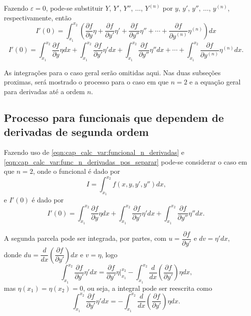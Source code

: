 \documentclass[
	12pt,				%
	openright,			%
    twoside,			%
	a4paper,			%
	english,			%
	french,				%
	spanish,			%
	brazil				%
	]{abntex2}
\numberwithin{lema}{chapter}
\numberwithin{teorema}{chapter}
\numberwithin{definicao}{chapter}
\numberwithin{exemplo}{chapter}
\numberwithin{figure}{chapter}
\begin{document}
Fazendo $\varepsilon=0$, pode-se substituir $Y$, $Y'$, $Y''$, $\dots$, $Y^{(n)}$ por $y$, $y'$, $y''$, $\dots$, $y^{(n)}$, respectivamente, então
$$
	I'(0)= \int_{x_1}^{x_2} \left (
		\frac{\partial f}{\partial y} \eta
		+
		\frac{\partial f}{\partial y'} \eta'
		+
		\frac{\partial f}{\partial y''} \eta''
		+
		\cdots
		+
		\frac{\partial f}{\partial y^{(n)}} \eta^{(n)}
	\right )dx
$$
\begin{equation}
	\label{eqn:cap_calc_var:func_n_derivadas_pos_separar}
	I'(0)= 
	\int_{x_1}^{x_2}
		\frac{\partial f}{\partial y} \eta
	dx
	+		
	\int_{x_1}^{x_2}
		\frac{\partial f}{\partial y'} \eta'
	dx
	+
	\int_{x_1}^{x_2}
		\frac{\partial f}{\partial y''} \eta''
	dx
	+
	\cdots
	+
	\int_{x_1}^{x_2}
		\frac{\partial f}{\partial y^{(n)}} \eta^{(n)}
	dx
	\text{.}
\end{equation}

As integrações para o caso geral serão omitidas aqui. Nas duas subseções proximas, será mostrado o processo para o caso em que $n=2$ e a equação geral para derivadas até a ordem $n$.

\subsection{Processo para funcionais que dependem de derivadas de segunda ordem}

Fazendo uso de \eqref{eqn:cap_calc_var:funcional_n_derivadas} e \eqref{eqn:cap_calc_var:func_n_derivadas_pos_separar} pode-se considerar o caso em que $n=2$, onde o funcional é dado por
$$
	I=\int_{x_1}^{x_2} f(x, y, y', y'')dx
	\text{,}
$$
e $I'(0)$ é dado por
\begin{equation}
	\label{eqn:cap_calc_var:func_2_derivada_integracao}
	I'(0)=
	\int_{x_1}^{x_2}
		\frac{\partial f}{\partial y}
		\eta
	dx
	+
	\int_{x_1}^{x_2}
		\frac{\partial f}{\partial y'}
		\eta'
	dx
	+
	\int_{x_1}^{x_2}
		\frac{\partial f}{\partial y''}
		\eta''
	dx
	\text{.}
\end{equation}

A segunda parcela pode ser integrada, por partes, com $u=\dfrac{\partial f}{\partial y'}$ e $dv=\eta'dx$, donde 
$du=\dfrac{d}{dx} \left (
	\dfrac{\partial f}{\partial y'}
\right ) dx$ e $v=\eta$, logo
$$
	\int_{x_1}^{x_2} \frac{\partial f}{\partial y'}\eta ' dx
	=
	\frac{\partial f}{\partial y'}\eta \Big |_{x_1}^{x_2}
	-
	\int_{x_1}^{x_2}
		\frac{d}{dx} \left (
			\frac{\partial f}{\partial y'}
		\right ) \eta dx
	\text{,}
$$
mas $\eta(x_1)=\eta(x_2)=0$, ou seja, a integral pode ser reescrita como
\begin{equation}
	\label{eqn:cap_calc_var:func_2_derivadas_membro2}
	\int_{x_1}^{x_2} \frac{\partial f}{\partial y'}\eta ' dx
	=
	-
	\int_{x_1}^{x_2}
		\frac{d}{dx} \left (
			\frac{\partial f}{\partial y'}
		\right ) \eta dx
	\text{.}
\end{equation}
\end{document}
